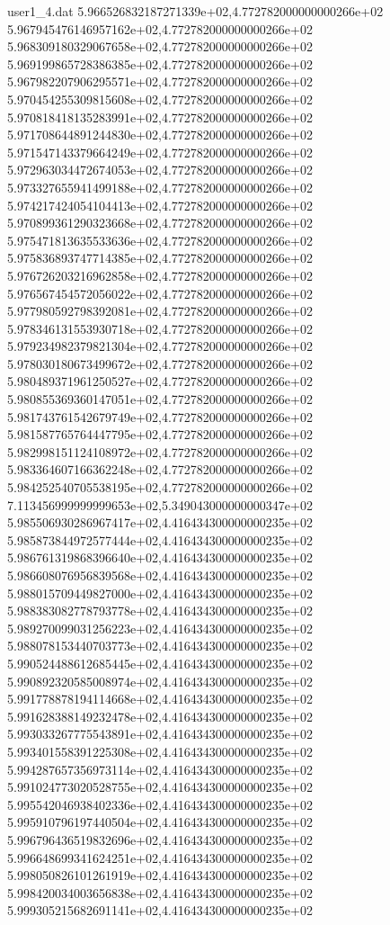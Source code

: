 \begin{filecontents}{user1_4.dat}
5.966526832187271339e+02,4.772782000000000266e+02
5.967945476146957162e+02,4.772782000000000266e+02
5.968309180329067658e+02,4.772782000000000266e+02
5.969199865728386385e+02,4.772782000000000266e+02
5.967982207906295571e+02,4.772782000000000266e+02
5.970454255309815608e+02,4.772782000000000266e+02
5.970818418135283991e+02,4.772782000000000266e+02
5.971708644891244830e+02,4.772782000000000266e+02
5.971547143379664249e+02,4.772782000000000266e+02
5.972963034472674053e+02,4.772782000000000266e+02
5.973327655941499188e+02,4.772782000000000266e+02
5.974217424054104413e+02,4.772782000000000266e+02
5.970899361290323668e+02,4.772782000000000266e+02
5.975471813635533636e+02,4.772782000000000266e+02
5.975836893747714385e+02,4.772782000000000266e+02
5.976726203216962858e+02,4.772782000000000266e+02
5.976567454572056022e+02,4.772782000000000266e+02
5.977980592798392081e+02,4.772782000000000266e+02
5.978346131553930718e+02,4.772782000000000266e+02
5.979234982379821304e+02,4.772782000000000266e+02
5.978030180673499672e+02,4.772782000000000266e+02
5.980489371961250527e+02,4.772782000000000266e+02
5.980855369360147051e+02,4.772782000000000266e+02
5.981743761542679749e+02,4.772782000000000266e+02
5.981587765764447795e+02,4.772782000000000266e+02
5.982998151124108972e+02,4.772782000000000266e+02
5.983364607166362248e+02,4.772782000000000266e+02
5.984252540705538195e+02,4.772782000000000266e+02
7.113456999999999653e+02,5.349043000000000347e+02
5.985506930286967417e+02,4.416434300000000235e+02
5.985873844972577444e+02,4.416434300000000235e+02
5.986761319868396640e+02,4.416434300000000235e+02
5.986608076956839568e+02,4.416434300000000235e+02
5.988015709449827000e+02,4.416434300000000235e+02
5.988383082778793778e+02,4.416434300000000235e+02
5.989270099031256223e+02,4.416434300000000235e+02
5.988078153440703773e+02,4.416434300000000235e+02
5.990524488612685445e+02,4.416434300000000235e+02
5.990892320585008974e+02,4.416434300000000235e+02
5.991778878194114668e+02,4.416434300000000235e+02
5.991628388149232478e+02,4.416434300000000235e+02
5.993033267775543891e+02,4.416434300000000235e+02
5.993401558391225308e+02,4.416434300000000235e+02
5.994287657356973114e+02,4.416434300000000235e+02
5.991024773020528755e+02,4.416434300000000235e+02
5.995542046938402336e+02,4.416434300000000235e+02
5.995910796197440504e+02,4.416434300000000235e+02
5.996796436519832696e+02,4.416434300000000235e+02
5.996648699341624251e+02,4.416434300000000235e+02
5.998050826101261919e+02,4.416434300000000235e+02
5.998420034003656838e+02,4.416434300000000235e+02
5.999305215682691141e+02,4.416434300000000235e+02

\end{filecontents}
